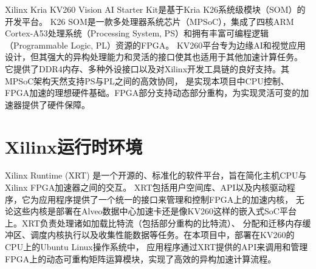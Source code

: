 Xilinx Kria KV260 Vision AI Starter Kit是基于Kria K26系统级模块（SOM）的开发平台。
K26 SOM是一款多处理器系统芯片（MPSoC），集成了四核ARM Cortex-A53处理系统（Processing System, PS）和拥有丰富可编程逻辑（Programmable Logic, PL）资源的FPGA。
KV260平台专为边缘AI和视觉应用设计，但其强大的异构处理能力和灵活的接口使其也适用于其他加速计算任务。
它提供了DDR4内存、多种外设接口以及对Xilinx开发工具链的良好支持。其MPSoC架构天然支持PS与PL之间的高效协同，
是实现本项目中CPU控制、FPGA加速的理想硬件基础。FPGA部分支持动态部分重构，为实现灵活可变的加速器提供了硬件保障。

\section{Xilinx运行时环境}

Xilinx Runtime (XRT) 是一个开源的、标准化的软件平台，旨在简化主机CPU与Xilinx FPGA加速器之间的交互。
XRT包括用户空间库、API以及内核驱动程序，它为应用程序提供了一个统一的接口来管理和控制FPGA上的加速内核，
无论这些内核是部署在Alveo数据中心加速卡还是像KV260这样的嵌入式SoC平台上。XRT负责处理诸如加载比特流（包括部分重构的比特流）、
分配和迁移内存缓冲区、调度内核执行以及收集性能数据等任务。在本项目中，部署在KV260的CPU上的Ubuntu Linux操作系统中，
应用程序通过XRT提供的API来调用和管理FPGA上的动态可重构矩阵运算模块，实现了高效的异构加速计算流程。
